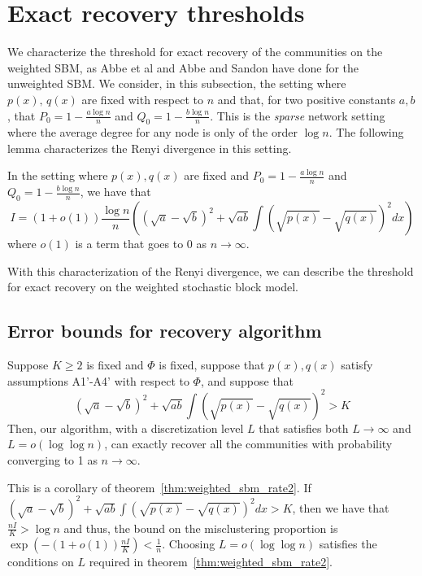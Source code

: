 \section{Exact recovery thresholds}
\label{sec:threshold}

We characterize the threshold for exact recovery of the communities on the weighted SBM, as Abbe et al \cite{abbe2014exact} and Abbe and Sandon \cite{AbbSan15} have done for the unweighted SBM. We consider, in this subsection, the setting where $p(x),\, q(x)$ are fixed with respect to $n$ and that, for two positive constants $a, b$, that $P_0 = 1 - \frac{a \log n}{n}$ and $Q_0 =  1 - \frac{b \log n}{n} $. This is the \emph{sparse} network setting where the average degree for any node is only of the order $\log n$. The following lemma characterizes the Renyi divergence in this setting.

\begin{lemma}
In the setting where $p(x), q(x)$ are fixed and $P_0 = 1 - \frac{a \log n}{n}$ and $Q_0 = 1 - \frac{b \log n}{n}$, we have that 
\[
I = (1 + o(1)) \frac{\log n}{n} \left( (\sqrt{a} - \sqrt{b})^2 + \sqrt{ab} \int (\sqrt{p(x)} - \sqrt{q(x)})^2 dx \right)
\]
where $o(1)$ is a term that goes to 0 as $n \rightarrow \infty$.
\end{lemma}


With this characterization of the Renyi divergence, we can describe the threshold for exact recovery on the weighted stochastic block model. 

\subsection{Error bounds for recovery algorithm}

\begin{theorem}
\label{thm:threshold_achievability}
Suppose $K \geq 2$ is fixed and $\Phi$ is fixed, suppose that $p(x), q(x)$ satisfy assumptions A1'-A4' with respect to $\Phi$, and suppose that 
\[
 (\sqrt{a} - \sqrt{b})^2 + \sqrt{ab} \int (\sqrt{p(x)} - \sqrt{q(x)})^2 > K
\]
Then, our algorithm, with a discretization level $L$ that satisfies both $L \rightarrow \infty$ and $L = o( \log \log n)$, can exactly recover all the communities with probability converging to 1 as $n \rightarrow \infty$.
\end{theorem}

This is a corollary of theorem~\ref{thm:weighted_sbm_rate2}. If $ (\sqrt{a} - \sqrt{b})^2 + \sqrt{ab} \int (\sqrt{p(x)} - \sqrt{q(x)})^2 dx > K
$, then we have that $ \frac{ n I}{K} > \log n$ and thus, the bound on the misclustering proportion is $\exp( - (1+o(1)) \frac{n I}{K}) < \frac{1}{n}$. Choosing $L = o( \log \log n)$ satisfies the conditions on $L$ required in theorem~\ref{thm:weighted_sbm_rate2}. 

